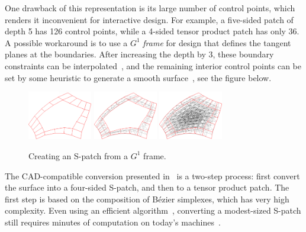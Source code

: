 \documentclass{article}
\begin{document}
One drawback of this representation is its large number of control points, which renders it
inconvenient for interactive design. For example, a five-sided patch of depth 5 has 126 control
points, while a 4-sided tensor product patch has only 36. A possible workaround is to use a
$G^1$ \emph{frame} for design that defines the tangent planes at the boundaries.
After increasing the depth by 3, these boundary constraints can be interpolated~\cite{spatch2},
and the remaining interior control points can be set by some heuristic to generate a smooth
surface~\cite{salvi-kepaf}, see the figure below.
\begin{figure}[h!]
  {
    \hfill
    \includegraphics[width = 0.25\textwidth]{images/5-5-bezier-ribbon.png}
    \hfill
    \includegraphics[width = 0.25\textwidth]{images/5-5-cnet-ribbon.png}
    \hfill
    \includegraphics[width = 0.25\textwidth]{images/5-5-cnet-full.png}
    \hfill
  }
  \caption{Creating an S-patch from a $G^1$ frame.}
\end{figure}

The CAD-compatible conversion presented in~\cite{spatch1} is a two-step process:
first convert the surface into a
four-sided S-patch, and then to a tensor product patch. The first step is based on the
composition of B\'ezier simplexes, which has very high complexity.
Even using an efficient algorithm~\cite{simplex2}, converting a modest-sized S-patch
still requires minutes of computation on today's machines~\cite{salvi-wait}.
\end{document}
